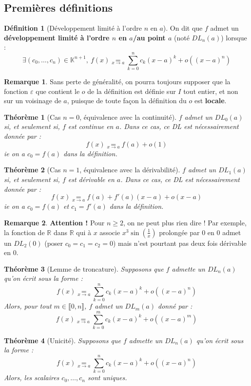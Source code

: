 \documentclass[french]{book}
\newcommand{\R}{\mathbb{R}}
\newcommand{\K}{\mathbb{K}}
\theoremstyle{plain}
\newtheorem{thm}{Théorème}[chapter]
\theoremstyle{definition}
\newtheorem{dfn}{Définition}[chapter]
\newtheorem{rmq}{Remarque}[chapter]
\theoremstyle{remark}
\begin{document}
\subsection{Premières définitions}
\begin{dfn}[Développement limité à l'ordre $n$ en $a$]
	On dit que $f$ admet un \textbf{développement limité à l'ordre $n$ en $a$/au point $a$} (noté $DL_n(a)$) lorsque : $$\exists(c_0,\ldots,c_n)\in\K^{n+1}, \ f(x)\underset{x\to a}{=}\sum_{k=0}^{n}c_k(x-a)^k+o\left((x-a)^n\right)$$
\end{dfn}
\begin{rmq}
	Sans perte de généralité, on pourra toujours supposer que la fonction $\varepsilon$ que contient le $o$ de la définition est définie sur $I$ tout entier, et non sur un voisinage de $a$, puisque de toute façon la définition du $o$ est \textbf{locale}.
\end{rmq}
\begin{thm}[Cas $n=0$, équivalence avec la continuité]
	$f$ admet un $DL_0(a)$ si, et seulement si, $f$ est continue en $a$. Dans ce cas, ce DL est nécessairement donnée par : $$f(x)\underset{x\to a}{=}f(a)+o(1)$$ ie on a $c_0=f(a)$ dans la définition.
\end{thm}
\begin{thm}[Cas $n=1$, équivalence avec la dérivabilité]
	$f$ admet un $DL_1(a)$ si, et seulement si, $f$ est dérivable en $a$. Dans ce cas, ce DL est nécessairement donnée par : $$f(x)\underset{x\to a}{=}f(a)+f'(a)(x-a)+o(x-a)$$ ie on a $c_0=f(a)$ et $c_1=f'(a)$ dans la définition.
\end{thm}
\begin{rmq}
	\textbf{Attention !} Pour $n\geqslant2$, on ne peut plus rien dire ! Par exemple, la fonction de $\R$ dans $\R$ qui à $x$ associe $\displaystyle x^3\sin\left(\frac{1}{x}\right)$ prolongée par $0$ en $0$ admet un $DL_2(0)$ (poser $c_0=c_1=c_2=0$) mais n'est pourtant pas deux fois dérivable en $0$.
\end{rmq}
\begin{thm}[Lemme de troncature]
	Supposons que $f$ admette un $DL_n(a)$ qu'on écrit sous la forme : $$f(x)\underset{x\to a}{=}\sum_{k=0}^{n}c_k(x-a)^k+o\left((x-a)^n\right)$$ Alors, pour tout $m\in\llbracket0,n\rrbracket$, $f$ admet un $DL_m(a)$ donné par : $$f(x)\underset{x\to a}{=}\sum_{k=0}^{m}c_k(x-a)^k+o\left((x-a)^m\right)$$
\end{thm}
\begin{thm}[Unicité]
	Supposons que $f$ admette un $DL_n(a)$ qu'on écrit sous la forme : $$f(x)\underset{x\to a}{=}\sum_{k=0}^{n}c_k(x-a)^k+o\left((x-a)^n\right)$$ Alors, les scalaires $c_0,\ldots,c_n$ sont uniques.
\end{thm}
\end{document}
